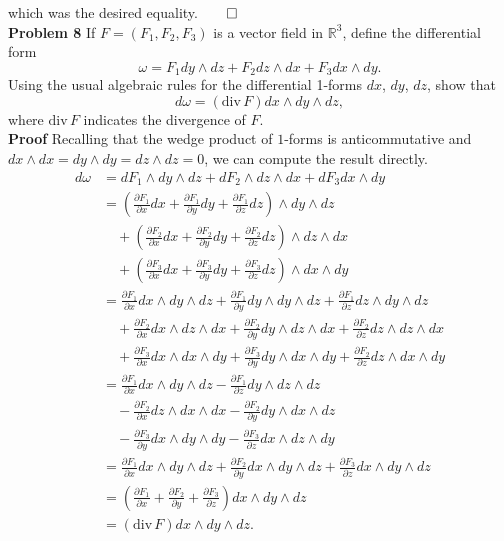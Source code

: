 \documentclass[11pt, letterpaper]{article}
\newcommand{\mbb}[1]{\mathbb{#1}}
\begin{document}
    which was the desired equality.\hfill{$\qed$}\\[10pt]
    {\bf Problem 8} If $F=(F_1,F_2,F_3)$ is a vector field in $\mbb{R}^3$, define the differential form
    \[\omega=F_1dy\wedge dz+F_2dz\wedge dx+F_3 dx\wedge dy.\]
    Using the usual algebraic rules for the differential 1-forms $dx$, $dy$, $dz$, show that
    \[d\omega=(\text{div}\,F)dx\wedge dy\wedge dz,\]
    where $\text{div}\,F$ indicates the divergence of $F$.\\[10pt]
    {\bf Proof} Recalling that the wedge product of $1$-forms is anticommutative and $dx\wedge dx=dy\wedge dy=dz\wedge dz=0$, we can compute the result directly.
    \begin{align*}
        d\omega&=dF_1\wedge dy\wedge dz + dF_2\wedge dz\wedge dx +dF_3 dx\wedge dy\\
        &=\left(\frac{\partial F_1}{\partial x}dx+\frac{\partial F_1}{\partial y}dy+\frac{\partial F_1}{\partial z}dz\right)\wedge dy\wedge dz\\
        &\quad+\left(\frac{\partial F_2}{\partial x}dx+\frac{\partial F_2}{\partial y}dy+\frac{\partial F_2}{\partial z}dz\right)\wedge dz\wedge dx\\
        &\quad+\left(\frac{\partial F_3}{\partial x}dx+\frac{\partial F_3}{\partial y}dy+\frac{\partial F_3}{\partial z}dz\right)\wedge dx\wedge dy\\
        &=\frac{\partial F_1}{\partial x}dx\wedge dy\wedge dz+\frac{\partial F_1}{\partial y}dy\wedge dy\wedge dz+\frac{\partial F_1}{\partial z}dz\wedge dy\wedge dz\\
        &\quad+\frac{\partial F_2}{\partial x}dx\wedge dz\wedge dx+\frac{\partial F_2}{\partial y}dy\wedge dz\wedge dx+\frac{\partial F_2}{\partial z}dz\wedge dz\wedge dx\\
        &\quad+\frac{\partial F_3}{\partial x}dx\wedge dx\wedge dy+\frac{\partial F_3}{\partial y}dy\wedge dx\wedge dy+\frac{\partial F_2}{\partial z}dz\wedge dx\wedge dy\\
        &=\frac{\partial F_1}{\partial x}dx\wedge dy\wedge dz-\frac{\partial F_1}{\partial z}dy\wedge dz\wedge dz\\
        &\quad-\frac{\partial F_2}{\partial x}dz\wedge dx\wedge dx-\frac{\partial F_2}{\partial y}dy\wedge dx\wedge dz\\
        &\quad-\frac{\partial F_3}{\partial y}dx\wedge dy\wedge dy-\frac{\partial F_3}{\partial z}dx\wedge dz\wedge dy\\
        &=\frac{\partial F_1}{\partial x}dx\wedge dy\wedge dz+\frac{\partial F_2}{\partial y}dx\wedge dy\wedge dz+\frac{\partial F_3}{\partial z}dx\wedge dy\wedge dz\\
        &=\left(\frac{\partial F_1}{\partial x}+\frac{\partial F_2}{\partial y}+\frac{\partial F_3}{\partial z}\right)dx\wedge dy\wedge dz\\
        &=(\text{div}\,F)dx\wedge dy\wedge dz.\tag*{$\qed$}
    \end{align*}
\end{document}
